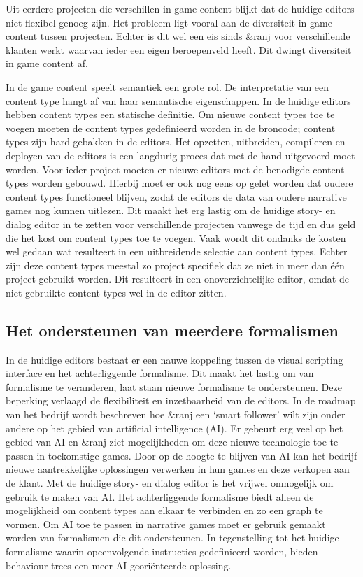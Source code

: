 Uit eerdere projecten die verschillen in game content blijkt dat de huidige editors niet flexibel genoeg zijn. Het probleem ligt vooral aan de diversiteit in game content tussen projecten. Echter is dit wel een eis sinds \&ranj voor verschillende klanten werkt waarvan ieder een eigen beroepenveld heeft. Dit dwingt diversiteit in game content af.

In de game content speelt semantiek een grote rol. De interpretatie van een content type hangt af van haar semantische eigenschappen. In de huidige editors hebben content types een statische definitie. Om nieuwe content types toe te voegen moeten de content types gedefinieerd worden in de broncode; content types zijn hard gebakken in de editors. Het opzetten, uitbreiden, compileren en deployen van de editors is een langdurig proces dat met de hand uitgevoerd moet worden. Voor ieder project moeten er nieuwe editors met de benodigde content types worden gebouwd. Hierbij moet er ook nog eens op gelet worden dat oudere content types functioneel blijven, zodat de editors de data van oudere narrative games nog kunnen uitlezen. Dit maakt het erg lastig om de huidige story- en dialog editor in te zetten voor verschillende projecten vanwege de tijd en dus geld die het kost om content types toe te voegen. Vaak wordt dit ondanks de kosten wel gedaan wat resulteert in een uitbreidende selectie aan content types. Echter zijn deze content types meestal zo project specifiek dat ze niet in meer dan één project gebruikt worden. Dit resulteert in een onoverzichtelijke editor, omdat de niet gebruikte content types wel in de editor zitten.

\subsection{Het ondersteunen van meerdere formalismen}
In de huidige editors bestaat er een nauwe koppeling tussen de visual scripting interface en het achterliggende formalisme. Dit maakt het lastig om van formalisme te veranderen, laat staan nieuwe formalisme te ondersteunen. Deze beperking verlaagd de flexibiliteit en inzetbaarheid van de editors. In de roadmap van het bedrijf wordt beschreven hoe \&ranj een ‘smart follower’ wilt zijn onder andere op het gebied van artificial intelligence (AI). Er gebeurt erg veel op het gebied van AI en \&ranj ziet mogelijkheden om deze nieuwe technologie toe te passen in toekomstige games. Door op de hoogte te blijven van AI kan het bedrijf nieuwe aantrekkelijke oplossingen verwerken in hun games en deze verkopen aan de klant. Met de huidige story- en dialog editor is het vrijwel onmogelijk om gebruik te maken van AI. Het achterliggende formalisme biedt alleen de mogelijkheid om content types aan elkaar te verbinden en zo een graph te vormen. Om AI toe te passen in narrative games moet er gebruik gemaakt worden van formalismen die dit ondersteunen. In tegenstelling tot het huidige formalisme waarin opeenvolgende instructies gedefinieerd worden, bieden behaviour trees een meer AI georiënteerde oplossing\cite{Pizzi}\cite{Lim2010}.

